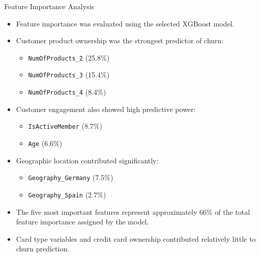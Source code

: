 \begin{frame}{Feature Importance Analysis}
    \footnotesize
\begin{itemize}
\item Feature importance was evaluated using the selected XGBoost model.

\item Customer product ownership was the strongest predictor of churn:
\begin{itemize}
    \item \texttt{NumOfProducts\_2} (25.8\%)
    \item \texttt{NumOfProducts\_3} (15.4\%)
    \item \texttt{NumOfProducts\_4} (8.4\%)
\end{itemize}

\item Customer engagement also showed high predictive power:
\begin{itemize}
    \item \texttt{IsActiveMember} (8.7\%)
    \item \texttt{Age} (6.6\%)
\end{itemize}

\item Geographic location contributed significantly:
\begin{itemize}
    \item \texttt{Geography\_Germany} (7.5\%)
    \item \texttt{Geography\_Spain} (2.7\%)
\end{itemize}

\item The five most important features represent approximately 66\% of the total feature importance assigned by the model.
\item Card type variables and credit card ownership contributed relatively little to churn prediction.

\end{itemize}
\end{frame}

